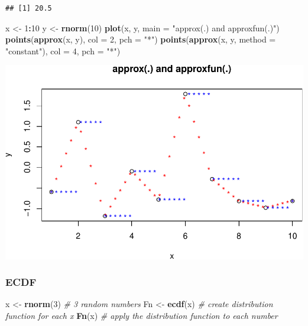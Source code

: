 \documentclass[]{book}
\newenvironment{Shaded}{\begin{snugshade}}{\end{snugshade}}
\newcommand{\CommentTok}[1]{\textcolor[rgb]{0.56,0.35,0.01}{\textit{#1}}}
\newcommand{\DataTypeTok}[1]{\textcolor[rgb]{0.13,0.29,0.53}{#1}}
\newcommand{\DecValTok}[1]{\textcolor[rgb]{0.00,0.00,0.81}{#1}}
\newcommand{\KeywordTok}[1]{\textcolor[rgb]{0.13,0.29,0.53}{\textbf{#1}}}
\newcommand{\NormalTok}[1]{#1}
\newcommand{\OperatorTok}[1]{\textcolor[rgb]{0.81,0.36,0.00}{\textbf{#1}}}
\newcommand{\StringTok}[1]{\textcolor[rgb]{0.31,0.60,0.02}{#1}}
\begin{document}
\begin{verbatim}
## [1] 20.5
\end{verbatim}

\begin{Shaded}
\begin{Highlighting}[]
\NormalTok{x <-}\StringTok{ }\DecValTok{1}\OperatorTok{:}\DecValTok{10}
\NormalTok{y <-}\StringTok{ }\KeywordTok{rnorm}\NormalTok{(}\DecValTok{10}\NormalTok{)}
\KeywordTok{plot}\NormalTok{(x, y, }\DataTypeTok{main =} \StringTok{"approx(.) and approxfun(.)"}\NormalTok{)}
\KeywordTok{points}\NormalTok{(}\KeywordTok{approx}\NormalTok{(x, y), }\DataTypeTok{col =} \DecValTok{2}\NormalTok{, }\DataTypeTok{pch =} \StringTok{"*"}\NormalTok{)}
\KeywordTok{points}\NormalTok{(}\KeywordTok{approx}\NormalTok{(x, y, }\DataTypeTok{method =} \StringTok{"constant"}\NormalTok{), }\DataTypeTok{col =} \DecValTok{4}\NormalTok{, }\DataTypeTok{pch =} \StringTok{"*"}\NormalTok{)}
\end{Highlighting}
\end{Shaded}

\includegraphics{AdvancedR_Companion_files/figure-latex/unnamed-chunk-237-1.pdf}

\hypertarget{ecdf}{%
\subsubsection*{ECDF}\label{ecdf}}

\begin{Shaded}
\begin{Highlighting}[]
\NormalTok{x <-}\StringTok{ }\KeywordTok{rnorm}\NormalTok{(}\DecValTok{3}\NormalTok{) }\CommentTok{# 3 random numbers}
\NormalTok{Fn <-}\StringTok{ }\KeywordTok{ecdf}\NormalTok{(x) }\CommentTok{# create distribution function for each x}
\KeywordTok{Fn}\NormalTok{(x) }\CommentTok{# apply the distribution function to each number}
\end{Highlighting}
\end{Shaded}
\end{document}
